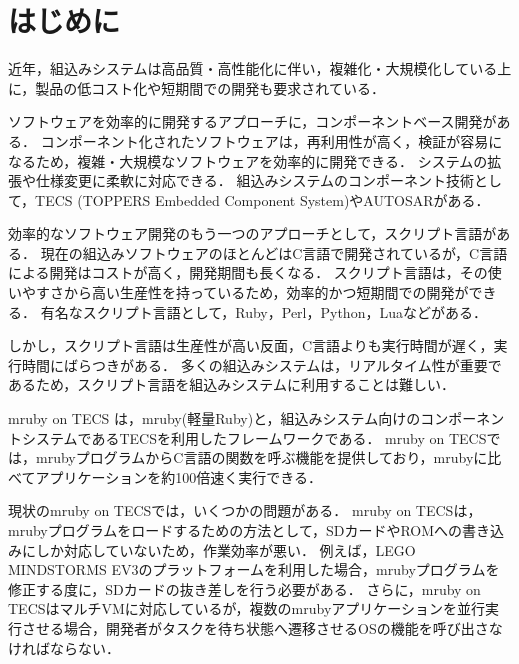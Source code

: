 \documentclass[submit,techrep]{ipsj}
\begin{document}

\maketitle

\section{はじめに}
\vspace{-2mm}
近年，組込みシステムは高品質・高性能化に伴い，複雑化・大規模化している上に，製品の低コスト化や短期間での開発も要求されている．

ソフトウェアを効率的に開発するアプローチに，コンポーネントベース開発がある．
コンポーネント化されたソフトウェアは，再利用性が高く，検証が容易になるため，複雑・大規模なソフトウェアを効率的に開発できる．
システムの拡張や仕様変更に柔軟に対応できる．
組込みシステムのコンポーネント技術として，TECS (TOPPERS Embedded Component System)\cite{par:TECS}やAUTOSAR\cite{url:AUTOSAR}がある．

効率的なソフトウェア開発のもう一つのアプローチとして，スクリプト言語がある．
現在の組込みソフトウェアのほとんどはC言語で開発されているが，C言語による開発はコストが高く，開発期間も長くなる．
スクリプト言語は，その使いやすさから高い生産性を持っているため，効率的かつ短期間での開発ができる．
有名なスクリプト言語として，Ruby，Perl，Python，Luaなどがある．

しかし，スクリプト言語は生産性が高い反面，C言語よりも実行時間が遅く，実行時間にばらつきがある．
多くの組込みシステムは，リアルタイム性が重要であるため，スクリプト言語を組込みシステムに利用することは難しい．

mruby on TECS \cite{par:mrubyonTECS}は，mruby(軽量Ruby)\cite{par:mruby}と，組込みシステム向けのコンポーネントシステムであるTECSを利用したフレームワークである．
mruby on TECSでは，mrubyプログラムからC言語の関数を呼ぶ機能を提供しており，mrubyに比べてアプリケーションを約100倍速く実行できる．

現状のmruby on TECSでは，いくつかの問題がある．
mruby on TECSは，mrubyプログラムをロードするための方法として，SDカードやROMへの書き込みにしか対応していないため，作業効率が悪い．
例えば，LEGO MINDSTORMS EV3のプラットフォーム\cite{par:EV3}を利用した場合，mrubyプログラムを修正する度に，SDカードの抜き差しを行う必要がある．
さらに，mruby on TECSはマルチVMに対応しているが，複数のmrubyアプリケーションを並行実行させる場合，開発者がタスクを待ち状態へ遷移させるOSの機能を呼び出さなければならない．
\end{document}
